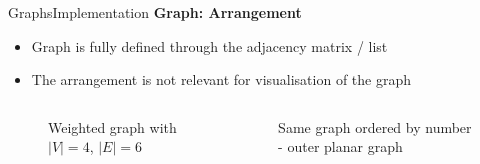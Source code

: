 \begin{frame}{Graphs}{Implementation}
  \textbf{Graph: Arrangement}
   \begin{itemize}
    \item<2->
      Graph is fully defined through the
      {\color{Mittel-Blau}adjacency matrix / list}
    \item<3->
      The arrangement is not relevant for visualisation of the graph
  \end{itemize}
   \begin{columns}
    \begin{column}[b]{0.4\linewidth}
      \begin{figure}[!h]
        \begin{adjustbox}{width=0.8\linewidth}
          
        \end{adjustbox}
        \vspace{-0.75em}
        \caption{Weighted graph with {\color{Mittel-Blau}$\vert V \vert = 4$},
          {\color{Mittel-Blau}$\vert E \vert = 6$}}
      \end{figure}
    \end{column}
    \begin{column}[b]{0.55\linewidth}
      \begin{figure}[!h]
        \begin{adjustbox}{width=0.875\linewidth}
          
        \end{adjustbox}
        \vspace{-0.75em}
        \caption{Same graph ordered by number - outer planar graph}
      \end{figure}
    \end{column}
  \end{columns}
\end{frame}



